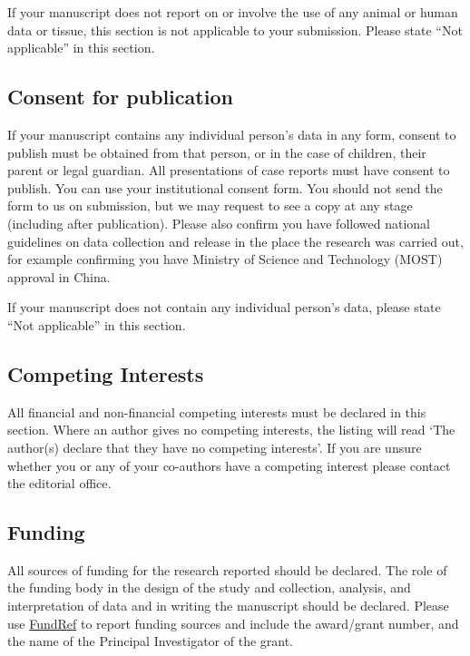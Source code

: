 \documentclass[a4paper,num-refs,gigabyte]{oup-contemporary}
\begin{document}
If your manuscript does not report on or involve the use of any animal or human data or tissue, this section is not applicable to your submission. Please state ``Not applicable'' in this section.

\subsection{Consent for publication}

If your manuscript contains any individual person's data in any form, consent to publish must be obtained from that person, or in the case of children, their parent or legal guardian. All presentations of case reports must have consent to publish. You can use your institutional consent form. You should not send the form to us on submission, but we may request to see a copy at any stage (including after publication). Please also confirm you have followed national guidelines on data collection and release in the place the research was carried out, for example confirming you have Ministry of Science and Technology (MOST) approval in China.

If your manuscript does not contain any individual person's data, please state ``Not applicable'' in this section.

\subsection{Competing Interests}

All financial and non-financial competing interests must be declared in this section. 
Where an author gives no competing interests, the listing will read `The author(s) declare that they have no competing interests'. If you are unsure whether you or any of your co-authors have a competing interest please contact the editorial office.


\subsection{Funding}

All sources of funding for the research reported should be declared. The role of the funding body in the design of the study and collection, analysis, and interpretation of data and in writing the manuscript should be declared. Please use \href{http://www.crossref.org/fundingdata/}{FundRef} to report funding sources and include the award/grant number, and the name of the Principal Investigator of the grant. 
\end{document}
